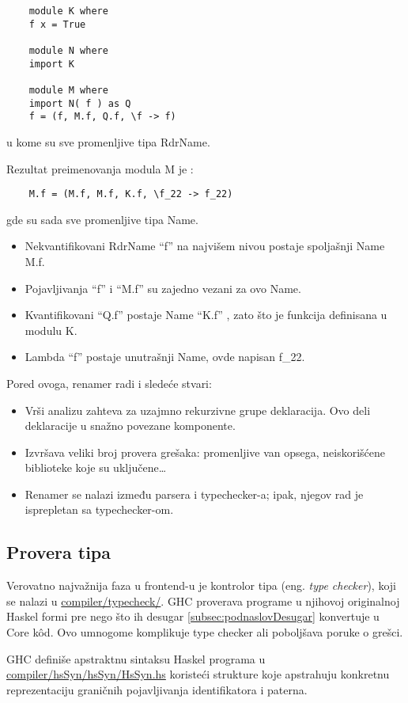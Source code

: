 \begin{verbatim}
	module K where
	f x = True
	
	module N where
	import K
	
	module M where
	import N( f ) as Q
	f = (f, M.f, Q.f, \f -> f)
\end{verbatim}
u kome su sve promenljive tipa RdrName. 

Rezultat preimenovanja modula M je :
\begin{verbatim}
	M.f = (M.f, M.f, K.f, \f_22 -> f_22)
\end{verbatim} 
gde su sada sve promenljive tipa Name.
\begin{itemize}
	\item Nekvantifikovani RdrName “f” na najvišem nivou postaje spoljašnji Name M.f.
	\item Pojavljivanja “f” i  “M.f” su zajedno vezani za ovo Name.
	\item Kvantifikovani “Q.f” postaje Name “K.f” , zato što je funkcija definisana u modulu K.
	\item Lambda “f” postaje unutrašnji Name, ovde napisan f\_22.
\end{itemize}

Pored ovoga, renamer radi i sledeće stvari:
\begin{itemize}
	\item Vrši analizu zahteva za uzajmno rekurzivne grupe deklaracija. Ovo deli deklaracije u snažno povezane komponente.
	\item Izvršava veliki broj provera grešaka: promenljive van opsega, neiskorišćene biblioteke koje su uključene\ldots
	\item Renamer se nalazi između parsera i typechecker-a; ipak, njegov rad je isprepletan sa typechecker-om.
\end{itemize}

\subsection{Provera tipa}
\label{subsec:podnaslovTypecheck}

Verovatno najvažnija faza u frontend-u je kontrolor tipa (eng. \emph{type checker}), koji se nalazi u \underline{compiler/typecheck/}. GHC proverava programe u njihovoj originalnoj Haskel formi pre nego što ih desugar \ref{subsec:podnaslovDesugar} konvertuje u Core k\^{o}d. Ovo umnogome komplikuje type checker ali poboljšava poruke o grešci.

GHC definiše apstraktnu sintaksu Haskel programa u \\ \underline{compiler/hsSyn/hsSyn/HsSyn.hs}  koristeći strukture koje apstrahuju konkretnu reprezentaciju graničnih pojavljivanja identifikatora i paterna.

